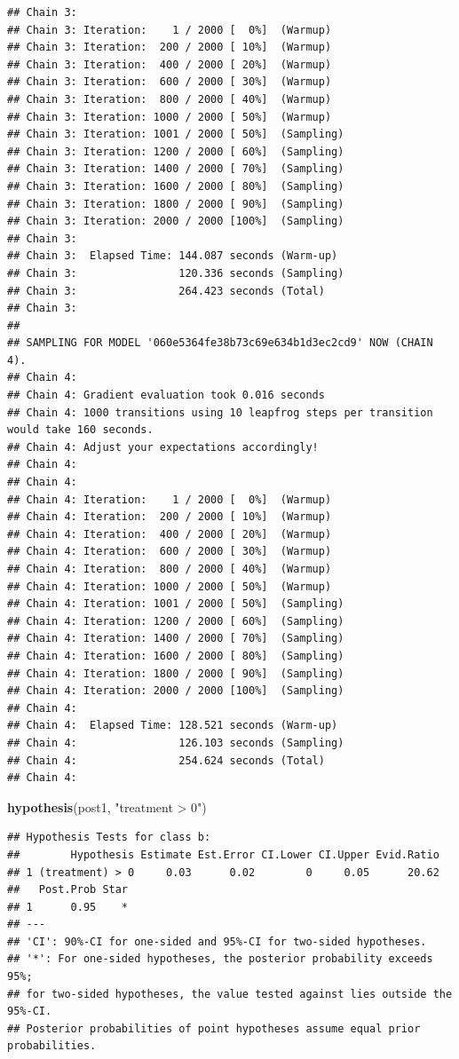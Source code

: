 \documentclass[]{article}
\newenvironment{Shaded}{\begin{snugshade}}{\end{snugshade}}
\newcommand{\KeywordTok}[1]{\textcolor[rgb]{0.13,0.29,0.53}{\textbf{#1}}}
\newcommand{\NormalTok}[1]{#1}
\newcommand{\StringTok}[1]{\textcolor[rgb]{0.31,0.60,0.02}{#1}}
\begin{document}
\begin{verbatim}
## Chain 3: 
## Chain 3: Iteration:    1 / 2000 [  0%]  (Warmup)
## Chain 3: Iteration:  200 / 2000 [ 10%]  (Warmup)
## Chain 3: Iteration:  400 / 2000 [ 20%]  (Warmup)
## Chain 3: Iteration:  600 / 2000 [ 30%]  (Warmup)
## Chain 3: Iteration:  800 / 2000 [ 40%]  (Warmup)
## Chain 3: Iteration: 1000 / 2000 [ 50%]  (Warmup)
## Chain 3: Iteration: 1001 / 2000 [ 50%]  (Sampling)
## Chain 3: Iteration: 1200 / 2000 [ 60%]  (Sampling)
## Chain 3: Iteration: 1400 / 2000 [ 70%]  (Sampling)
## Chain 3: Iteration: 1600 / 2000 [ 80%]  (Sampling)
## Chain 3: Iteration: 1800 / 2000 [ 90%]  (Sampling)
## Chain 3: Iteration: 2000 / 2000 [100%]  (Sampling)
## Chain 3: 
## Chain 3:  Elapsed Time: 144.087 seconds (Warm-up)
## Chain 3:                120.336 seconds (Sampling)
## Chain 3:                264.423 seconds (Total)
## Chain 3: 
## 
## SAMPLING FOR MODEL '060e5364fe38b73c69e634b1d3ec2cd9' NOW (CHAIN 4).
## Chain 4: 
## Chain 4: Gradient evaluation took 0.016 seconds
## Chain 4: 1000 transitions using 10 leapfrog steps per transition would take 160 seconds.
## Chain 4: Adjust your expectations accordingly!
## Chain 4: 
## Chain 4: 
## Chain 4: Iteration:    1 / 2000 [  0%]  (Warmup)
## Chain 4: Iteration:  200 / 2000 [ 10%]  (Warmup)
## Chain 4: Iteration:  400 / 2000 [ 20%]  (Warmup)
## Chain 4: Iteration:  600 / 2000 [ 30%]  (Warmup)
## Chain 4: Iteration:  800 / 2000 [ 40%]  (Warmup)
## Chain 4: Iteration: 1000 / 2000 [ 50%]  (Warmup)
## Chain 4: Iteration: 1001 / 2000 [ 50%]  (Sampling)
## Chain 4: Iteration: 1200 / 2000 [ 60%]  (Sampling)
## Chain 4: Iteration: 1400 / 2000 [ 70%]  (Sampling)
## Chain 4: Iteration: 1600 / 2000 [ 80%]  (Sampling)
## Chain 4: Iteration: 1800 / 2000 [ 90%]  (Sampling)
## Chain 4: Iteration: 2000 / 2000 [100%]  (Sampling)
## Chain 4: 
## Chain 4:  Elapsed Time: 128.521 seconds (Warm-up)
## Chain 4:                126.103 seconds (Sampling)
## Chain 4:                254.624 seconds (Total)
## Chain 4:
\end{verbatim}

\begin{Shaded}
\begin{Highlighting}[]
\KeywordTok{hypothesis}\NormalTok{(post1, }\StringTok{"treatment > 0"}\NormalTok{)}
\end{Highlighting}
\end{Shaded}

\begin{verbatim}
## Hypothesis Tests for class b:
##        Hypothesis Estimate Est.Error CI.Lower CI.Upper Evid.Ratio
## 1 (treatment) > 0     0.03      0.02        0     0.05      20.62
##   Post.Prob Star
## 1      0.95    *
## ---
## 'CI': 90%-CI for one-sided and 95%-CI for two-sided hypotheses.
## '*': For one-sided hypotheses, the posterior probability exceeds 95%;
## for two-sided hypotheses, the value tested against lies outside the 95%-CI.
## Posterior probabilities of point hypotheses assume equal prior probabilities.
\end{verbatim}
\end{document}
